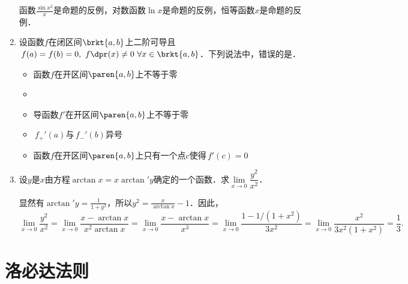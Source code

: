 \begin{enumerate}
  \ifshowsol
  函数\(\frac{\sin x^2}{x}\)是命题的反例，对数函数\(\ln x\)是命题的反例，恒等函数\(x\)是命题的反例．
  \fi

\item 设函数\(f\)在闭区间\(\brkt{a,b}\)上二阶可导且\(\,f(a) = f(b) = 0,\ f\dpr(x) \ne 0\ \forall x \in \brkt{a,b}\)．下列说法中，错误的是\uline{\hspace{8em}}．
  \begin{itemize}
    \renewcommand{\labelitemi}{\faCircleThin}
  \item 函数\(f\)在开区间\(\paren{a,b}\)上不等于零
    \ifshowsol
  \item[\faCircle]
    \else
  \item
    \fi
    导函数\(f'\!\)在开区间\(\paren{a,b}\)上不等于零
  \item \(\,f_+'(a)\)与\(\,f_-'(b)\)异号
  \item 函数\(f\)在开区间\(\paren{a,b}\)上只有一个点\(c\)使得\(\,f'(c) = 0\)
  \end{itemize}

\item 设\(y\)是\(x\)由方程\(\arctan x = x \arctan' y\)确定的一个函数．求\(\lim\limits_{x\to0} \dfrac{y^2}{x^2}\)．

  \ifshowsol
  显然有\(\arctan' y = \frac{1}{1+y^2}\)，所以\(y^2 = \frac{x}{\arctan x} - 1\)．因此，
  \begin{equation*}
    \lim_{x\to0} \frac{y^2}{x^2}
    = \lim_{x\to0} \frac{x-\arctan x}{x^2 \arctan x}
    = \lim_{x\to0} \frac{x-\arctan x}{x^3}
    = \lim_{x\to0} \frac{1-1/(1+x^2)}{3x^2}
    = \lim_{x\to0} \frac{x^2}{3x^2(1+x^2)}
    = \frac13.
  \end{equation*}
  \fi
\end{enumerate}
\fi

\section{洛必达法则}

